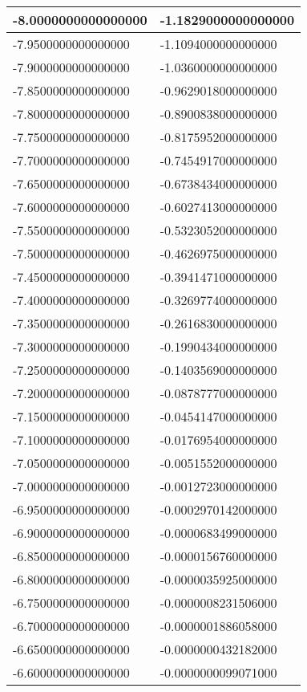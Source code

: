 \documentclass[a4paper,14pt]{article}
\begin{document}
\begin{longtable}{|l|l|}
-8.0000000000000000	&	-1.1829000000000000\\ \hline
-7.9500000000000000	&	-1.1094000000000000\\ \hline
-7.9000000000000000	&	-1.0360000000000000\\ \hline
-7.8500000000000000	&	-0.9629018000000000\\ \hline
-7.8000000000000000	&	-0.8900838000000000\\ \hline
-7.7500000000000000	&	-0.8175952000000000\\ \hline
-7.7000000000000000	&	-0.7454917000000000\\ \hline
-7.6500000000000000	&	-0.6738434000000000\\ \hline
-7.6000000000000000	&	-0.6027413000000000\\ \hline
-7.5500000000000000	&	-0.5323052000000000\\ \hline
-7.5000000000000000	&	-0.4626975000000000\\ \hline
-7.4500000000000000	&	-0.3941471000000000\\ \hline
-7.4000000000000000	&	-0.3269774000000000\\ \hline
-7.3500000000000000	&	-0.2616830000000000\\ \hline
-7.3000000000000000	&	-0.1990434000000000\\ \hline
-7.2500000000000000	&	-0.1403569000000000\\ \hline
-7.2000000000000000	&	-0.0878777000000000\\ \hline
-7.1500000000000000	&	-0.0454147000000000\\ \hline
-7.1000000000000000	&	-0.0176954000000000\\ \hline
-7.0500000000000000	&	-0.0051552000000000\\ \hline
-7.0000000000000000	&	-0.0012723000000000\\ \hline
-6.9500000000000000	&	-0.0002970142000000\\ \hline
-6.9000000000000000	&	-0.0000683499000000\\ \hline
-6.8500000000000000	&	-0.0000156760000000\\ \hline
-6.8000000000000000	&	-0.0000035925000000\\ \hline
-6.7500000000000000	&	-0.0000008231506000\\ \hline
-6.7000000000000000	&	-0.0000001886058000\\ \hline
-6.6500000000000000	&	-0.0000000432182000\\ \hline
-6.6000000000000000	&	-0.0000000099071000\\ \hline

\end{longtable}
\end{document}
